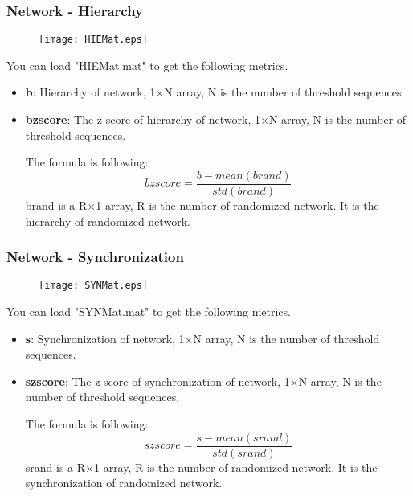 \documentclass[11pt]{article}
\begin{document}
			\subsubsection{Network - Hierarchy}
				\begin{figure}
					\begin{center}
						\texttt{[image: HIEMat.eps]}
					\end{center}
				\end{figure}
				You can load "HIEMat.mat" to get the following metrics.
				\begin{itemize}
					\item \textbf{b}: Hierarchy of network,
						1$\times$N array, N is the number of threshold sequences.
					\item \textbf{bzscore}: The z-score of hierarchy of network,
						1$\times$N array, N is the number of threshold sequences.

						The formula is following:
						$$bzscore=\frac{b-mean(brand)}{std(brand)}$$
						brand is a R$\times$1 array, R is the number of randomized network. 
						It is the hierarchy of randomized network.
				\end{itemize}
			\subsubsection{Network - Synchronization}
				\begin{figure}
					\begin{center}
						\texttt{[image: SYNMat.eps]}
					\end{center}
				\end{figure}
				You can load "SYNMat.mat" to get the following metrics.
				\begin{itemize}
					\item \textbf{s}: Synchronization of network,
						1$\times$N array, N is the number of threshold sequences.
					\item \textbf{szscore}: The z-score of synchronization of network,
						1$\times$N array, N is the number of threshold sequences.

						The formula is following:
						$$szscore=\frac{s-mean(srand)}{std(srand)}$$
						srand is a R$\times$1 array, R is the number of randomized network. 
						It is the synchronization of randomized network.
				\end{itemize}
\end{document}
